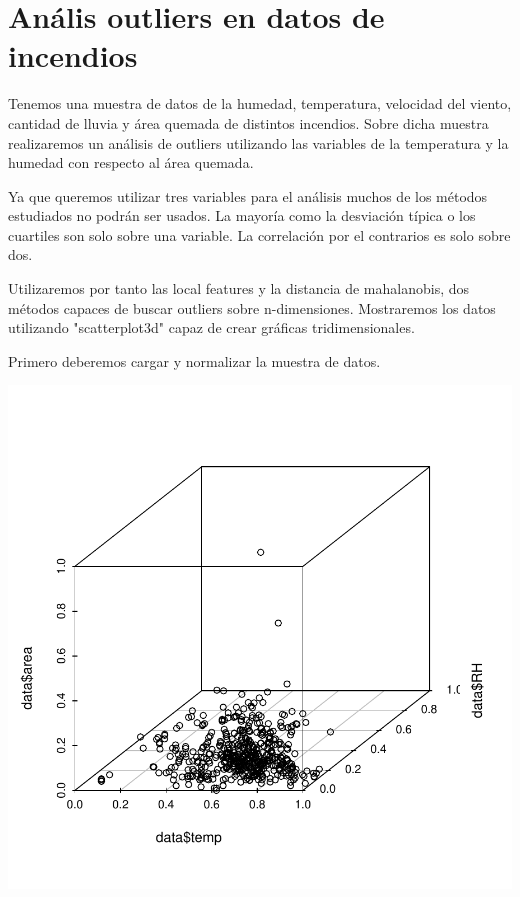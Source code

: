 \documentclass [a4paper] {article}
\begin{document}
\newpage
\section{Anális outliers en datos de incendios}
Tenemos una muestra de datos de la humedad, temperatura, velocidad del viento, cantidad de lluvia y área quemada de distintos incendios.
Sobre dicha muestra realizaremos un análisis de outliers utilizando las variables de la temperatura y la humedad con respecto al área quemada.

Ya que queremos utilizar tres variables para el análisis muchos de los métodos estudiados no podrán ser usados.
La mayoría como la desviación típica o los cuartiles son solo sobre una variable. La correlación por el contrarios es solo sobre dos.

Utilizaremos por tanto las local features y la distancia de mahalanobis, dos métodos capaces de buscar outliers sobre n-dimensiones.
Mostraremos los datos utilizando "scatterplot3d" capaz de crear gráficas tridimensionales.

Primero deberemos cargar y normalizar la muestra de datos.
\begin{center}
\begin{Schunk}
\end{Schunk}
\includegraphics{entrega-forest_fires_data}
\end{center}
\end{document}
